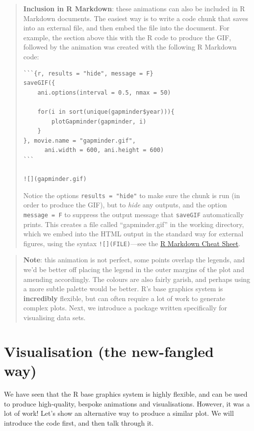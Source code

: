 \documentclass[]{book}
\theoremstyle{definition}
\theoremstyle{definition}
\theoremstyle{definition}
\theoremstyle{remark}
\begin{document}
\begin{quote}
\textbf{Inclusion in R Markdown}: these animations can also be included
in R Markdown documents. The easiest way is to write a code chunk that
saves into an external file, and then embed the file into the document.
For example, the section above this with the R code to produce the GIF,
followed by the animation was created with the following R Markdown
code:

\begin{verbatim}
```{r, results = "hide", message = F}
saveGIF({
    ani.options(interval = 0.5, nmax = 50)
    
    for(i in sort(unique(gapminder$year))){
        plotGapminder(gapminder, i)
    }
}, movie.name = "gapminder.gif", 
      ani.width = 600, ani.height = 600)
``` 

![](gapminder.gif)
\end{verbatim}

Notice the options \texttt{results\ =\ "hide"} to make sure the chunk is
run (in order to produce the GIF), but to \emph{hide} any outputs, and
the option \texttt{message\ =\ F} to suppress the output message that
\texttt{saveGIF} automatically prints. This creates a file called
``gapminder.gif'' in the working directory, which we embed into the HTML
output in the standard way for external figures, using the syntax
\texttt{!{[}{]}(FILE)}---see the
\href{https://www.rstudio.com/wp-content/uploads/2016/03/rmarkdown-cheatsheet-2.0.pdf}{R
Markdown Cheat Sheet}.
\end{quote}

\begin{quote}
\textbf{Note}: this animation is not perfect, some points overlap the
legends, and we'd be better off placing the legend in the outer margins
of the plot and amending accordingly. The colours are also fairly
garish, and perhaps using a more subtle palette would be better. R's
base graphics system is \textbf{incredibly} flexible, but can often
require a lot of work to generate complex plots. Next, we introduce a
package written specifically for visualising data sets.
\end{quote}

\chapter{Visualisation (the new-fangled
way)}\label{visualisation-the-new-fangled-way}

We have seen that the R base graphics system is highly flexible, and can
be used to produce high-quality, bespoke animations and visualisations.
However, it was a lot of work! Let's show an alternative way to produce
a similar plot. We will introduce the code first, and then talk through
it.
\end{document}

